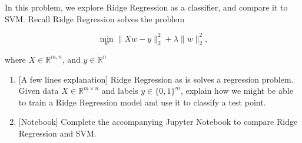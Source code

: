 \rm

In this problem, we explore Ridge Regression as a classifier, and compare it to SVM. Recall Ridge Regression solves the problem

\begin{equation*}
    \min_w \|Xw - y\|_2^2 + \lambda \|w\|_2^2,
\end{equation*}

where $X \in \mathbb{R}^{m, n}$, and $y \in \mathbb{R}^n$

\begin{enumerate}
    \item {[A few lines explanation]} Ridge Regression as is solves a regression problem. Given data $X \in \mathbb{R}^{m \times n}$ and labels $y \in \{0, 1\}^m$, explain how we might be able to train a Ridge Regression model and use it to classify a test point.
    
    \sol{}
    
    \item {[Notebook]}
    Complete the accompanying Jupyter Notebook to compare Ridge Regression and SVM. 
    
    \sol{}
\end{enumerate}